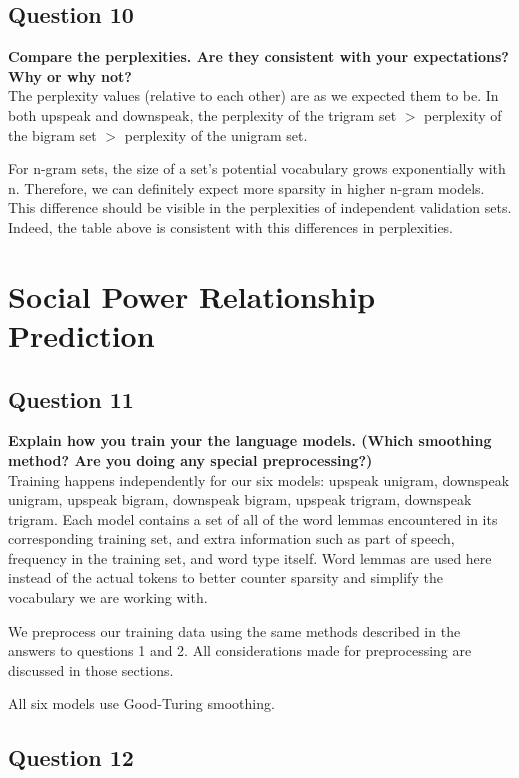 \documentclass{article} %
\begin{document}
\subsection*{Question 10}

\textbf{Compare the perplexities. Are they consistent with your expectations? Why or why not?}
\\

The perplexity values (relative to each other) are as we expected them to be. In both upspeak and downspeak, the perplexity of the trigram set $>$ perplexity of the bigram set $>$ perplexity of the unigram set.

For n-gram sets, the size of a set's potential vocabulary grows exponentially with n. Therefore, we can definitely expect more sparsity in higher n-gram models. This difference should be visible in the perplexities of independent validation sets. Indeed, the table above is consistent with this differences in perplexities.


\section{Social Power Relationship Prediction}


\subsection*{Question 11}

\textbf{Explain how you train your the language models. (Which smoothing method? Are you doing any special preprocessing?)}
\\

Training happens independently for our six models: upspeak unigram, downspeak unigram, upspeak bigram, downspeak bigram, upspeak trigram, downspeak trigram. Each model contains a set of all of the word lemmas encountered in its corresponding training set, and extra information such as part of speech, frequency in the training set, and word type itself. Word lemmas are used here instead of the actual tokens to better counter sparsity and simplify the vocabulary we are working with.

We preprocess our training data using the same methods described in the answers to questions 1 and 2. All considerations made for preprocessing are discussed in those sections.

All six models use Good-Turing smoothing.

\subsection*{Question 12}
\end{document}
